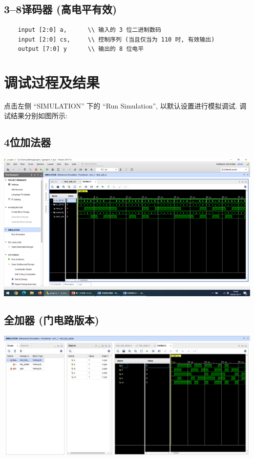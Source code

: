 \documentclass{article}
\begin{document}
\subsection{3--8译码器 (高电平有效)}

\begin{lstlisting}
    input [2:0] a,      \\ 输入的 3 位二进制数码
    input [2:0] cs,     \\ 控制序列 (当且仅当为 110 时, 有效输出)
    output [7:0] y      \\ 输出的 8 位电平
\end{lstlisting}

\section{调试过程及结果}

点击左侧 ``SIMULATION'' 下的 ``Run Simulation'', 以默认设置进行模拟调试. 调试结果分别如图所示:

\subsection{4位加法器}

\begin{center}
    \includegraphics{assets/image_4_adder.png}
\end{center}

\subsection{全加器 (门电路版本)}

\begin{center}
    \includegraphics[width=500pt]{assets/image_full_adder.png}
\end{center}
\end{document}
